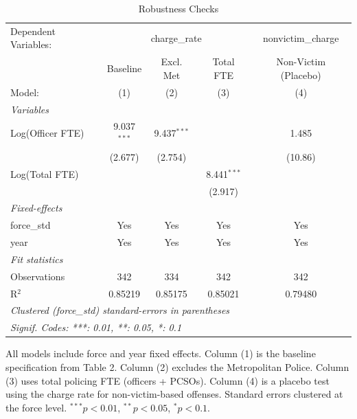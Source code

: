 
\begin{table}[htbp]
   \caption{\label{tab:robust} Robustness Checks}
   \centering
   \begin{tabular}{lcccc}
      \tabularnewline \midrule \midrule
      Dependent Variables: & \multicolumn{3}{c}{charge\_rate} & nonvictim\_charge\\
                       & Baseline      & Excl. Met     & Total FTE     & Non-Victim (Placebo) \\   
      Model:           & (1)           & (2)           & (3)           & (4)\\  
      \midrule
      \emph{Variables}\\
      Log(Officer FTE) & 9.037$^{***}$ & 9.437$^{***}$ &               & 1.485\\   
                       & (2.677)       & (2.754)       &               & (10.86)\\   
      Log(Total FTE)   &               &               & 8.441$^{***}$ &   \\   
                       &               &               & (2.917)       &   \\   
      \midrule
      \emph{Fixed-effects}\\
      force\_std       & Yes           & Yes           & Yes           & Yes\\  
      year             & Yes           & Yes           & Yes           & Yes\\  
      \midrule
      \emph{Fit statistics}\\
      Observations     & 342           & 334           & 342           & 342\\  
      R$^2$            & 0.85219       & 0.85175       & 0.85021       & 0.79480\\  
      \midrule \midrule
      \multicolumn{5}{l}{\emph{Clustered (force\_std) standard-errors in parentheses}}\\
      \multicolumn{5}{l}{\emph{Signif. Codes: ***: 0.01, **: 0.05, *: 0.1}}\\
   \end{tabular}
   
   \par \raggedright 
   All models include force and year fixed effects. Column (1) is the baseline specification from Table 2. Column (2) excludes the Metropolitan Police. Column (3) uses total policing FTE (officers + PCSOs). Column (4) is a placebo test using the charge rate for non-victim-based offenses. Standard errors clustered at the force level. $^{***}p<0.01$, $^{**}p<0.05$, $^{*}p<0.1$.
\end{table}


